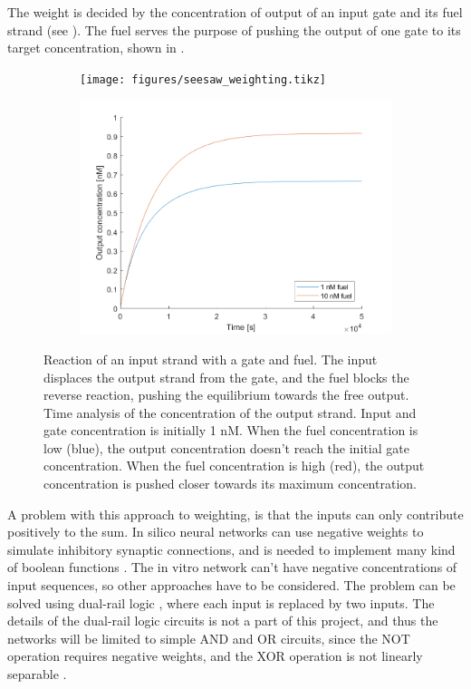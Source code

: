 The weight is decided by the concentration of output of an input gate and its fuel strand (see ). The fuel serves the purpose of pushing the output of one gate to its target concentration, shown in .

\begin{figure}[h]
\begin{subfigure}[t]{.49\textwidth}
  \texttt{[image: figures/seesaw\_weighting.tikz]}
  \caption{}
  \label{seesaw_weighting_reaction}
\end{subfigure}
\hfill
\begin{subfigure}[t]{.49\columnwidth}
  \includegraphics[width=\linewidth]{images/weighting}
  \caption{}
  \label{seesaw_weighting_analysis}
\end{subfigure}
\caption{ Reaction of an input strand with a gate and fuel. The input displaces the output strand from the gate, and the fuel blocks the reverse reaction, pushing the equilibrium towards the free output.  Time analysis of the concentration of the output strand. Input and gate concentration is initially 1 nM. When the fuel concentration is low (blue), the output concentration doesn't reach the initial gate concentration. When the fuel concentration is high (red), the output concentration is pushed closer towards its maximum concentration.}
\label{seesaw_weighting}
\end{figure}

A problem with this approach to weighting, is that the inputs can only contribute positively to the sum. In silico neural networks can use negative weights to simulate inhibitory synaptic connections, and is needed to implement many kind of boolean functions \cite{ZhaoYanling}. The in vitro network can't have negative concentrations of input sequences, so other approaches have to be considered. The problem can be solved using dual-rail logic \cite{Qian2011}, where each input is replaced by two inputs. The details of the dual-rail logic circuits is not a part of this project, and thus the networks will be limited to simple AND and OR circuits, since the NOT operation requires negative weights, and the XOR operation is not linearly separable \cite{ZhaoYanling}.


